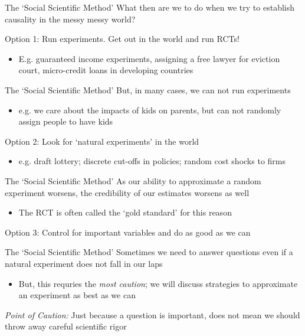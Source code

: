 \documentclass[aspectratio=169,t,11pt,table]{beamer}
\begin{document}
\begin{frame}{The `Social Scientific Method'}
  What then are we to do when we try to establish causality in the messy messy world?

  \bigskip
  {\color{magenta} Option 1}: Run experiments. Get out in the world and run RCTs! 
  \begin{itemize}
    \item E.g. guaranteed income experiments, assigning a free lawyer for eviction court, micro-credit loans in developing countries
  \end{itemize}
\end{frame}

\begin{frame}{The `Social Scientific Method'}
  But, in many cases, we can not run experiments
  \begin{itemize}
    \item e.g. we care about the impacts of kids on parents, but can not randomly assign people to have kids
  \end{itemize}

  \bigskip
  {\color{magenta} Option 2}: Look for `natural experiments' in the world
  \begin{itemize}
    \item e.g. draft lottery; discrete cut-offs in policies; random cost shocks to firms
  \end{itemize}
\end{frame}

\begin{frame}{The `Social Scientific Method'}
  As our ability to approximate a random experiment worsens, the credibility of our estimates worsens as well
  \begin{itemize}
    \item The RCT is often called the `gold standard' for this reason
  \end{itemize}

  \bigskip
  {\color{magenta} Option 3}: Control for important variables and do as good as we can
\end{frame}

\begin{frame}{The `Social Scientific Method'}
  Sometimes we need to answer questions even if a natural experiment does not fall in our laps
  \begin{itemize}    
    \item But, this requries the \emph{most caution}; we will discuss strategies to approximate an experiment as best as we can
  \end{itemize}

  \bigskip
  \emph{Point of Caution:} Just because a question is important, does not mean we should throw away careful scientific rigor
\end{frame}
\end{document}
